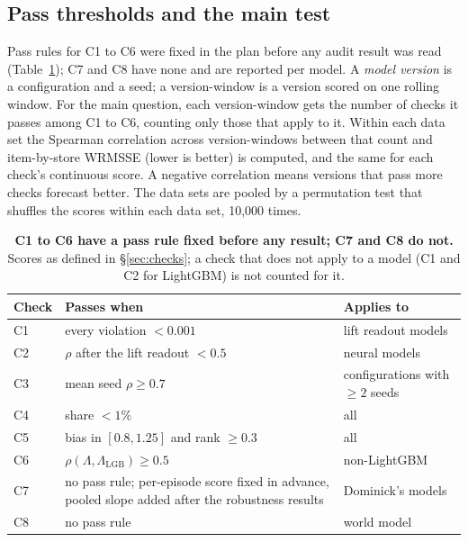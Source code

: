 \subsection{Pass thresholds and the main test}
\label{sec:test}

Pass rules for C1 to C6 were fixed in the plan before any audit result was read
(Table~\ref{tab:thresholds}); C7 and C8 have none and are reported per model.
A \emph{model version} is a configuration and a seed; a version-window is a
version scored on one rolling window. For the main question, each
version-window gets the number of checks it passes among C1 to C6, counting
only those that apply to it. Within each data set the Spearman correlation
across version-windows between that count and item-by-store WRMSSE (lower is
better) is computed, and the same for each check's continuous score. A negative
correlation means versions that pass more checks forecast better. The data sets
are pooled by a permutation test that shuffles the scores within each data set,
10{,}000 times.

\begin{table}[t]
\centering
\caption{\textbf{C1 to C6 have a pass rule fixed before any result; C7 and C8
do not.} Scores as defined in \S\ref{sec:checks}; a check that does not apply
to a model (C1 and C2 for LightGBM) is not counted for it.}
\label{tab:thresholds}
\footnotesize
\begin{tabular}{@{}lp{3.3cm}p{2.3cm}@{}}
\toprule
Check & Passes when & Applies to\\
\midrule
C1 & every violation $< 0.001$ & lift readout models\\
C2 & $\rho$ after the lift readout $< 0.5$ & neural models\\
C3 & mean seed $\rho \ge 0.7$ & configurations with $\ge 2$ seeds\\
C4 & share $< 1\%$ & all\\
C5 & bias in $[0.8, 1.25]$ and rank $\ge 0.3$ & all\\
C6 & $\rho(\Lambda, \Lambda_{\mathrm{LGB}}) \ge 0.5$ & non-LightGBM\\
C7 & no pass rule; per-episode score fixed in advance, pooled slope added after
the robustness results & Dominick's models\\
C8 & no pass rule & world model\\
\bottomrule
\end{tabular}
\end{table}
